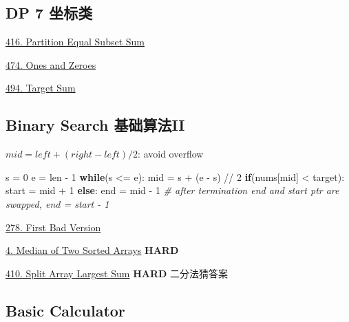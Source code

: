 \documentclass[
]{article}
\newenvironment{Shaded}{}{}
\newcommand{\BuiltInTok}[1]{#1}
\newcommand{\CommentTok}[1]{\textcolor[rgb]{0.38,0.63,0.69}{\textit{#1}}}
\newcommand{\ControlFlowTok}[1]{\textcolor[rgb]{0.00,0.44,0.13}{\textbf{#1}}}
\newcommand{\DecValTok}[1]{\textcolor[rgb]{0.25,0.63,0.44}{#1}}
\newcommand{\NormalTok}[1]{#1}
\newcommand{\OperatorTok}[1]{\textcolor[rgb]{0.40,0.40,0.40}{#1}}
\begin{document}
\hypertarget{dp-7-ux5750ux6807ux7c7b}{%
\subsection{DP 7 坐标类}\label{dp-7-ux5750ux6807ux7c7b}}

\href{https://leetcode.com/problems/partition-equal-subset-sum/}{416.
Partition Equal Subset Sum}

\href{https://leetcode.com/problems/ones-and-zeroes/}{474. Ones and
Zeroes}

\href{https://leetcode.com/problems/target-sum/}{494. Target Sum}

\hypertarget{binary-search-ux57faux7840ux7b97ux6cd5ii}{%
\subsection{Binary Search
基础算法II}\label{binary-search-ux57faux7840ux7b97ux6cd5ii}}

\(mid = left + (right - left) / 2\): avoid overflow

\begin{Shaded}
\begin{Highlighting}[]
\NormalTok{s }\OperatorTok{=} \DecValTok{0}
\NormalTok{e }\OperatorTok{=} \BuiltInTok{len} \OperatorTok{{-}} \DecValTok{1}
\ControlFlowTok{while}\NormalTok{(s }\OperatorTok{\textless{}=}\NormalTok{ e):}
\NormalTok{    mid }\OperatorTok{=}\NormalTok{ s }\OperatorTok{+}\NormalTok{ (e }\OperatorTok{{-}}\NormalTok{ s) }\OperatorTok{//} \DecValTok{2}
    \ControlFlowTok{if}\NormalTok{(nums[mid] }\OperatorTok{\textless{}}\NormalTok{ target):}
\NormalTok{        start }\OperatorTok{=}\NormalTok{ mid }\OperatorTok{+} \DecValTok{1}
    \ControlFlowTok{else}\NormalTok{:}
\NormalTok{        end }\OperatorTok{=}\NormalTok{ mid }\OperatorTok{{-}} \DecValTok{1}
\CommentTok{\# after termination end and start ptr are swapped, end = start {-} 1}
\end{Highlighting}
\end{Shaded}

\href{https://leetcode.com/problems/first-bad-version/}{278. First Bad
Version}

\href{https://leetcode.com/problems/median-of-two-sorted-arrays/}{4.
Median of Two Sorted Arrays} \textbf{HARD}

\href{https://leetcode.com/problems/split-array-largest-sum/}{410. Split
Array Largest Sum} \textbf{HARD} 二分法猜答案

\hypertarget{basic-calculator}{%
\subsection{\texorpdfstring{Basic Calculator
}{Basic Calculator }}\label{basic-calculator}}
\end{document}
